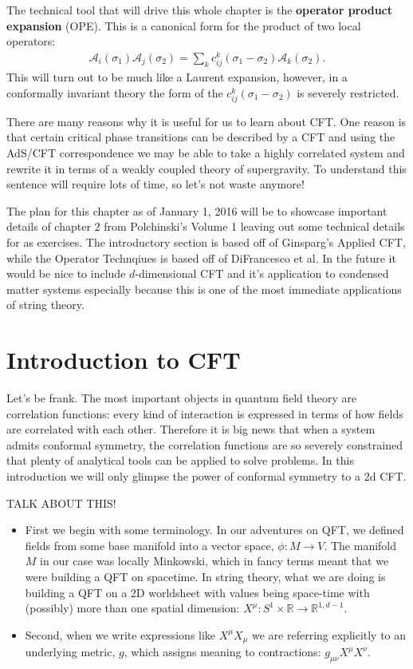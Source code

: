 \documentclass{report}
\theoremstyle{plain}
\theoremstyle{definition}
\theoremstyle{remark}
\newcommand{\mc}{\mathcal}
\newcommand{\sg}{\sigma}
\newcommand{\colr}[1]{ {\color{red} #1 } }
\newcommand{\bR}{\mathbb{R}}
\begin{document}
The technical tool that will drive this whole chapter is the
\textbf{operator product expansion} (OPE). This is a canonical form
for the product of two local operators:
\begin{align}
\mc A_i(\sg_1)\mc A_j(\sg_2) = \sum_k c^k_{ij}(\sg_1-\sg_2) \mc A_k(\sg_2).
\label{OPEdefinition}
\end{align}
This will turn out to be much like a Laurent expansion, however, in a
conformally invariant theory the form of the $c^k_{ij}(\sg_1-\sg_2)$ is
severely restricted.

There are many reasons why it is useful for us to learn about CFT. One
reason is that certain critical phase transitions can be described by a CFT
and using the AdS/CFT correspondence we may be able to take a highly
correlated system and rewrite it in terms of a weakly coupled theory of
supergravity. To understand this sentence will require lots of time, so
let's not waste anymore!

The plan for this chapter as of January 1, 2016 will be to showcase
important details of chapter $2$ from Polchinski's Volume 1 leaving out
some technical details for as exercises. The introductory section is based
off of Ginsparg's Applied CFT, while the Operator Technqiues is based off
of DiFrancesco et al. In the future it would be nice to include
$d$-dimensional CFT and it's application to condensed matter systems
especially because this is one of the most immediate applications of string
theory.

\section{Introduction to CFT}
Let's be frank. The most important objects in quantum field theory are
correlation functions: every kind of interaction is expressed in terms of
how fields are correlated with each other. Therefore it is big news that
when a system admits conformal symmetry, the correlation functions are so
severely constrained that plenty of analytical tools can be applied to
solve problems. In this introduction we will only glimpse the power of
conformal symmetry to a 2d CFT.

\colr{TALK ABOUT THIS!}
\begin{itemize}
\item
   First we begin with some terminology. In our adventures on QFT, we defined
   fields from some base manifold into a vector space, $\phi : M \to V$. The
   manifold $M$ in our case was locally Minkowski, which in fancy terms meant
   that we were building a QFT on spacetime. In string theory, what we are
   doing is building a QFT on a 2D worldsheet with values being space-time
   with (possibly) more than one spatial dimension: $X^\mu : S^1\times \bR \to
   \bR^{1,d-1}$.

\item
   Second, when we write expressions like $X^\mu X_\mu$ we are referring
   explicitly to an underlying metric, $g$, which assigns meaning to
   contractions: $g_{\mu\nu} X^\mu X^\nu$.
\end{itemize}
\end{document}
